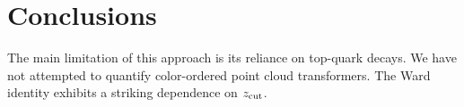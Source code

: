 \section{Conclusions}\label{sec:conclusions}

The main limitation of this approach is its reliance on top-quark
decays. We have not attempted to quantify color-ordered point cloud
transformers. The Ward identity exhibits a striking dependence on
$z_{\rm cut}$.

